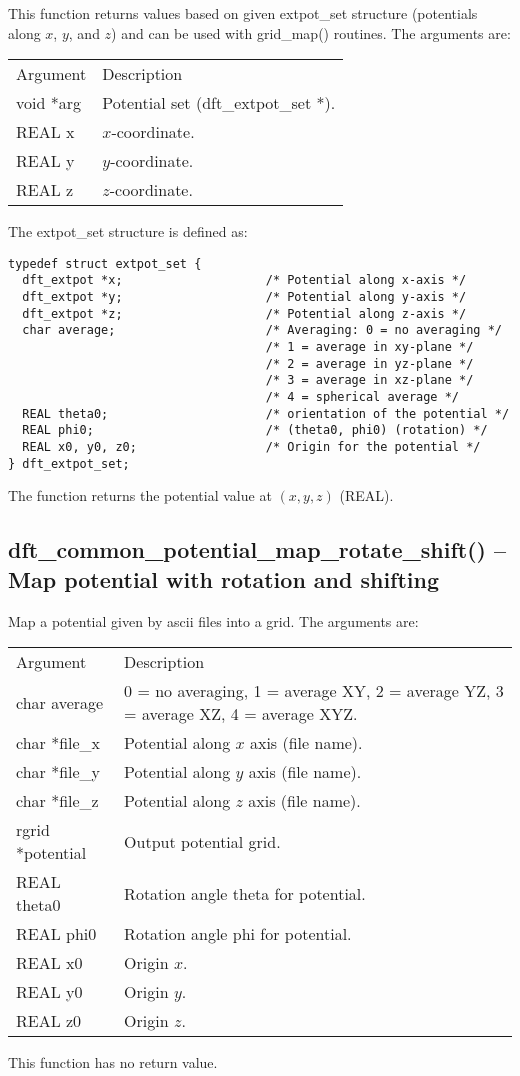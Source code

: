 \documentclass[12pt,letterpaper]{report}
\begin{document}
This function returns values based on given extpot\_set structure (potentials along $x$, $y$, and $z$) and can be used with grid\_map() routines. The arguments are:
\begin{longtable}{p{} p{}}
Argument & Description\\
\cline{1-2}
void *arg & Potential set (dft\_extpot\_set *).\\
REAL x & $x$-coordinate.\\
REAL y & $y$-coordinate.\\
REAL z & $z$-coordinate.\\
\end{longtable}
\noindent
The extpot\_set structure is defined as:
\begin{verbatim}
typedef struct extpot_set {
  dft_extpot *x;                    /* Potential along x-axis */
  dft_extpot *y;                    /* Potential along y-axis */
  dft_extpot *z;                    /* Potential along z-axis */
  char average;                     /* Averaging: 0 = no averaging */
                                    /* 1 = average in xy-plane */
                                    /* 2 = average in yz-plane */
                                    /* 3 = average in xz-plane */
                                    /* 4 = spherical average */
  REAL theta0;                      /* orientation of the potential */
  REAL phi0;                        /* (theta0, phi0) (rotation) */
  REAL x0, y0, z0;                  /* Origin for the potential */                                                               
} dft_extpot_set;
\end{verbatim}
The function returns the potential value at $(x,y,z)$ (REAL).

\subsection{dft\_common\_potential\_map\_rotate\_shift() -- Map potential with rotation and shifting}

Map a potential given by ascii files into a grid. The arguments are:
\begin{longtable}{p{} p{}}
Argument & Description\\
\cline{1-2}
char average & 0 = no averaging, 1 = average XY, 2 = average YZ, 3 = average XZ, 4 = average XYZ.\\
char *file\_x & Potential along $x$ axis (file name).\\
char *file\_y & Potential along $y$ axis (file name).\\
char *file\_z & Potential along $z$ axis (file name).\\
rgrid *potential & Output potential grid.\\
REAL theta0 & Rotation angle theta for potential.\\
REAL phi0   & Rotation angle phi for potential.\\
REAL x0    & Origin $x$.\\
REAL y0    & Origin $y$.\\
REAL z0    & Origin $z$.\\
\end{longtable}
\noindent
This function has no return value.
\end{document}
